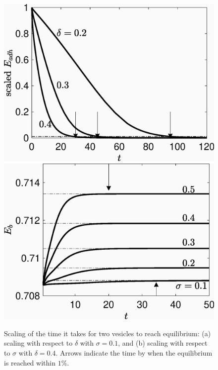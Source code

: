 \documentclass[aps,prl,twocolumn,showpacs,amsmath,amssymb]{revtex4-1}
\begin{document}
\begin{figure}
\includegraphics[keepaspectratio=true,scale=0.4]{figs/Dec13a_time_scaling01.eps}
\includegraphics[keepaspectratio=true,scale=0.4]{figs/Dec13a_time_scaling02.eps}
\caption{Scaling of the time it takes for two vesicles to reach equilibrium: (a) scaling with respect to $\delta$ with $\sigma=0.1$, and (b) scaling
with respect to $\sigma$ with $\delta = 0.4$. Arrows indicate the time by when the equilibrium is reached within $1\%$.}
\label{fig:qflow00}
\end{figure}
\end{document}
